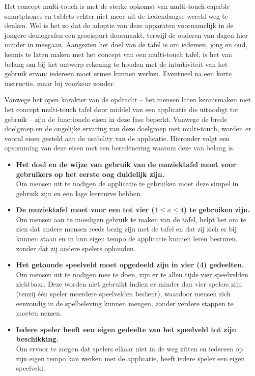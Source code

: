 \documentclass{acm}
\begin{document}
Het concept multi-touch is met de sterke opkomst van multi-touch capable smartphones en tablets echter niet meer uit de hedendaagse wereld weg te denken. Wel is het zo dat de adoptie van deze apparaten voornamelijk in de jongere demografen een groeispurt doormaakt, terwijl de ouderen van dagen hier minder in meegaan. Aangezien het doel van de tafel is om iedereen, jong en oud, kennis te laten maken met het concept van een multi-touch tafel, is het van belang om bij het ontwerp rekening te houden met de intu\"itiviteit van het gebruik ervan: iedereen moet ermee kunnen werken. Eventueel na een korte instructie, maar bij voorkeur zonder.

Vanwege het open karakter van de opdracht -- het mensen laten kennismaken met het concept multi-touch tafel door middel van een applicatie die uitnodigt tot gebruik -- zijn de functionele eisen in deze fase beperkt. Vanwege de brede doelgroep en de ongelijke ervaring van deze doelgroep met multi-touch, worden er vooral eisen gesteld aan de usability van de applicatie. Hieronder volgt een opsomming van deze eisen met een beredenering waarom deze van belang is.

\begin{itemize}
	\item \textbf{Het doel en de wijze van gebruik van de muziektafel moet voor gebruikers op het eerste oog duidelijk zijn.} \\ Om mensen uit te nodigen de applicatie te gebruiken moet deze simpel in gebruik zijn en een lage leercurve hebben.
	\item \textbf{De muziektafel moet voor een tot vier ($1{\le}x{\le}4$) te gebruiken zijn.} \\ Om mensen aan te moedigen gebruik te maken van de tafel, helpt het om te zien dat andere mensen reeds bezig zijn met de tafel en dat zij zich er bij kunnen staan en in hun eigen tempo de applicatie kunnen leren besturen, zonder dat zij andere spelers ophouden.
	\item \textbf{Het getoonde speelveld moet opgedeeld zijn in vier (4) gedeelten.} \\ Om mensen uit te nodigen mee te doen, zijn er te allen tijde vier speelvelden zichtbaar. Deze worden niet gebruikt indien er minder dan vier spelers zijn (tenzij \'e\'en speler meerdere speelvelden bedient), waardoor mensen zich eenvoudig in de spelbeleving kunnen mengen, zonder verdere stappen te moeten nemen.
	\item \textbf{Iedere speler heeft een eigen gedeelte van het speelveld tot zijn beschikking.} \\ Om ervoor te zorgen dat spelers elkaar niet in de weg zitten en iedereen op zijn eigen tempo kan werken met de applicatie, heeft iedere speler een eigen speelveld.
\end{itemize}
\end{document}
